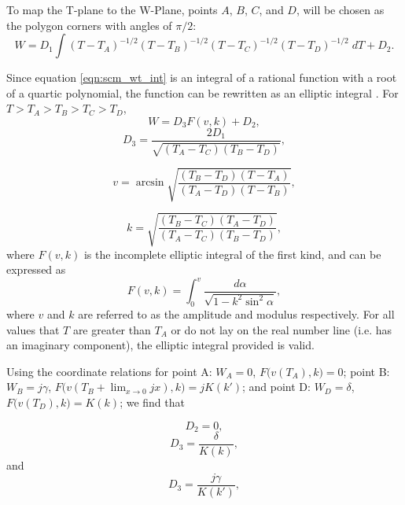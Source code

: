  \par To map the T-plane to the W-Plane, points $A$, $B$, $C$, and $D$, will be chosen as the polygon corners with angles of $\pi/2$:
 \begin{equation}
    W = D_1 \int (T-T_A)^{-1/2}(T-T_B)^{-1/2}(T-T_C)^{-1/2}(T-T_D)^{-1/2}\;dT + D_2.
    \label{eqn:scm_wt_int}
 \end{equation}
 
 \noindent Since equation \ref{eqn:scm_wt_int} is an integral of a rational function with a root of a quartic polynomial, the function can be rewritten as an elliptic integral \cite{i.s._gradshteyn_table_1980}. For $T > T_A > T_B > T_C > T_D$,
 \begin{equation}
     W = D_3F(v,k) + D_2,
 \end{equation}
 \begin{equation}
    D_3 = \frac{2D_1}{\sqrt{(T_A - T_C)(T_B-T_D)}},
 \end{equation}
 
 \begin{equation}
     v = \arcsin\sqrt{\frac{(T_B-T_D)(T-T_A)}{(T_A-T_D)(T-T_B)}},
 \end{equation}
 
 \begin{equation}
     k = \sqrt{\frac{(T_B-T_C)(T_A-T_D)}{(T_A-T_C)(T_B-T_D)}},
 \end{equation}
 \noindent where $F(v,k)$ is the incomplete elliptic integral of the first kind, and can be expressed as
 \begin{equation}
     F(v,k) = \int^v_0 \frac{d\alpha}{\sqrt{1 - k^2\sin^2\alpha}},
 \end{equation}
 \noindent where $v$ and $k$ are referred to as the amplitude and modulus respectively. For all values that $T$ are greater than $T_A$ or do not lay on the real number line (i.e. has an imaginary component), the elliptic integral provided is valid.
 
 \par Using the coordinate relations for point A: $W_A = 0$, $F\big(v(T_A),k\big) = 0$; point B: $W_B = j\gamma$, $F\big(v(T_B +\lim_{x\to 0} jx),k\big) = jK(k')$; and point D: $W_D = \delta$, $F\big(v(T_D),k\big) = K(k)$; we find that 
 
 \begin{equation}
     D_2 = 0,
 \end{equation}
 \begin{equation}
     D_3 = \frac{\delta}{K(k)},
     \label{eqn:D3 w/ d}
 \end{equation}
\noindent and
\begin{equation}
    D_3 = \frac{j\gamma}{K(k')},
    \label{eqn:D3 w/ gamma}
\end{equation}

